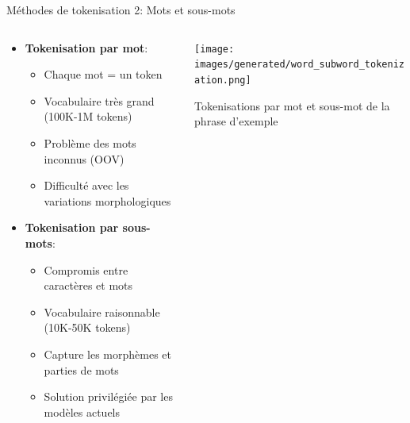 \documentclass[aspectratio=169,11pt]{beamer}
\begin{document}
\begin{frame}{Méthodes de tokenisation 2: Mots et sous-mots}
    \begin{columns}
        \begin{column}{0.5\textwidth}
            \begin{itemize}
                \item \textbf{Tokenisation par mot}:
                \begin{itemize}
                    \item Chaque mot = un token
                    \item Vocabulaire très grand (100K-1M tokens)
                    \item Problème des mots inconnus (OOV)
                    \item Difficulté avec les variations morphologiques
                \end{itemize}
                \vspace{0.3cm}
                \item \textbf{Tokenisation par sous-mots}:
                \begin{itemize}
                    \item Compromis entre caractères et mots
                    \item Vocabulaire raisonnable (10K-50K tokens)
                    \item Capture les morphèmes et parties de mots
                    \item Solution privilégiée par les modèles actuels
                \end{itemize}
            \end{itemize}
        \end{column}
        \begin{column}{0.5\textwidth}
            \texttt{[image: images/generated/word\_subword\_tokenization.png]}
            \vspace{0.2cm}
            \begin{center}
                \small{Tokenisations par mot et sous-mot de la phrase d'exemple}
            \end{center}
        \end{column}
    \end{columns}
\end{frame}
\end{document}
